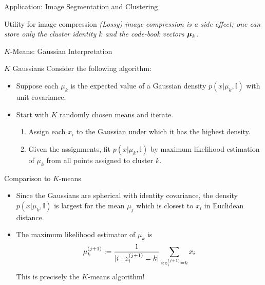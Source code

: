 \documentclass[10pt]{beamer}
\newcommand{\assign}{z} %
\begin{document}
\begin{frame}{Application: Image Segmentation and Clustering}
\begin{sblock}{Utility for image compression}
\it{(Lossy) image compression} is a side effect; one can store only the cluster identity $k$ and the \it{code-book vectors} ${\boldsymbol \mu}_k$.
\end{sblock}

\end{frame}

\begin{frame}{$K$-Means: Gaussian Interpretation}
	\scriptsize
\begin{sblock}{$K$ Gaussians}
Consider the following algorithm:
\begin{itemize}
\item Suppose each $\mu_k$ is the expected value of a Gaussian density $p(x|\mu_k, \mathbb{I})$ with unit covariance.
\item Start with $K$ randomly chosen means and iterate.
	\begin{enumerate}
	\scriptsize
	\item Assign each $x_i$ to the Gaussian under which it has the highest density.
	\item Given the assignments, fit $p(x|\mu_k, \mathbb{I})$ by maximum likelihood estimation of $\mu_k$ from all points assigned to cluster $k$.
	\end{enumerate}
\end{itemize}
\end{sblock}

\begin{sblock}{Comparison to $K$-means}
\begin{itemize}
	\scriptsize
\item Since the Gaussians are spherical with identity covariance, the density $p(x|\mu_k, \mathbb{I})$  is largest for the mean $\mu_j$ which is closest to $x_i$ in Euclidean distance.
\item The maximum likelihood estimator of $\mu_k$ is 
	\[ \mu_k^{(j+1)} := \df{1}{|i : \assign_i^{(j+1)} = k |}  \ds\sum_{i : \assign_i^{(j+1)} = k} x_i\]
	This is precisely the $K$-means algorithm!
\end{itemize}

\end{sblock}
\end{frame}
\end{document}
